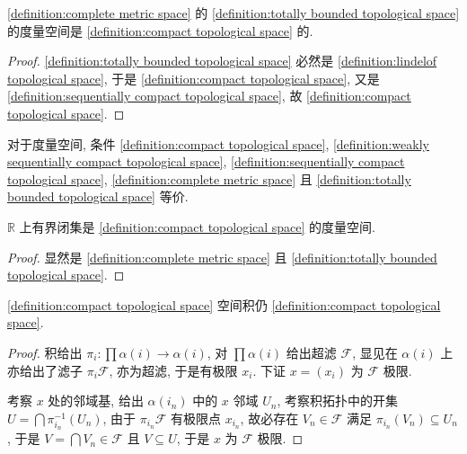 \begin{lemma}
    \ref{definition:complete metric space} 的 \ref{definition:totally bounded topological space} 的度量空间是 \ref{definition:compact topological space} 的.

    \begin{proof}
        \ref{definition:totally bounded topological space} 必然是 \ref{definition:lindelof topological space}, 于是 \ref{definition:compact topological space},
        又是 \ref{definition:sequentially compact topological space}, 故 \ref{definition:compact topological space}.
    \end{proof}
\end{lemma}

\begin{corollary}
    对于度量空间, 条件 \ref{definition:compact topological space}, \ref{definition:weakly sequentially compact topological space}, \ref{definition:sequentially compact topological space}, 
    \ref{definition:complete metric space} 且 \ref{definition:totally bounded topological space} 等价.
\end{corollary}

\begin{corollary}
    \(\mathbb{R}\) 上有界闭集是 \ref{definition:compact topological space} 的度量空间.

    \begin{proof}
        显然是 \ref{definition:complete metric space} 且 \ref{definition:totally bounded topological space}.
    \end{proof}
\end{corollary}

\begin{theorem}[Tychonoff]
    \label {theorem:tychonoff's theorem}
    \ref{definition:compact topological space} 空间积仍 \ref{definition:compact topological space}.

    \begin{proof}
        积给出 \(\pi_i : \prod \alpha(i) \to \alpha(i)\), 对 \(\prod \alpha(i)\) 给出超滤 \(\mathcal{F}\),
        显见在 \(\alpha(i)\) 上亦给出了滤子 \(\pi_i \mathcal{F}\), 亦为超滤, 于是有极限 \(x_i\). 下证 \(x = (x_i)\) 为 \(\mathcal{F}\) 极限.

        考察 \(x\) 处的邻域基, 给出 \(\alpha (i_n)\) 中的 \(x\) 邻域 \(U_n\), 考察积拓扑中的开集 \(U = \bigcap \pi_{i_n}^{-1} (U_n)\),
        由于 \(\pi_{i_n} \mathcal{F}\) 有极限点 \(x_{i_n}\), 故必存在 \(V_n \in \mathcal{F}\) 满足 \(\pi_{i_n} (V_n) \subseteq U_n\), 于是 \(V = \bigcap V_n \in \mathcal{F}\)
        且 \(V \subseteq U\), 于是 \(x\) 为 \(\mathcal{F}\) 极限.
    \end{proof}
\end{theorem}

